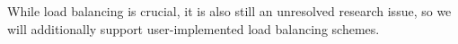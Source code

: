 \documentclass[11pt,letterpaper]{article}
\begin{document}

%
% 
 While load balancing is crucial, it is also still an unresolved
 research issue, so we will additionally support user-implemented load
 balancing schemes.
\end{document}

